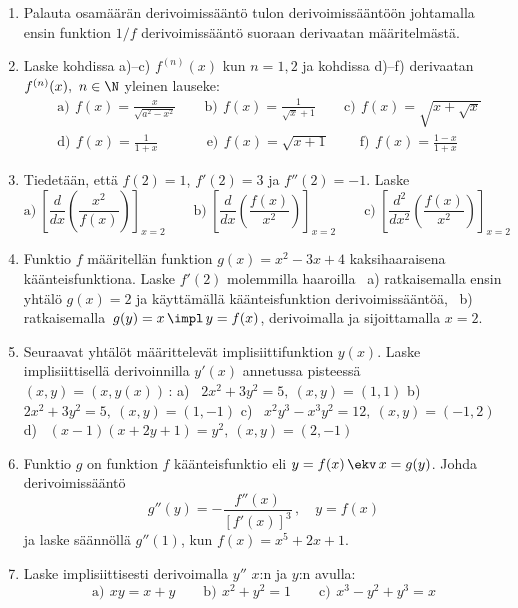 \begin{enumerate}
\item
Palauta osamäärän derivoimissääntö tulon derivoimissääntöön johtamalla ensin funktion
$1/f$ derivoimissääntö suoraan derivaatan määritelmästä.

\item
Laske kohdissa a)--c) $f^{(n)}(x)$ kun $n=1,2$ ja kohdissa d)--f) derivaatan
$f^{(n)}(x),\ n\in\N$ yleinen lauseke:
\begin{align*}
&\text{a)}\,\ f(x)=\frac{x}{\sqrt{a^2-x^2}} \qquad 
 \text{b)}\,\ f(x)=\frac{1}{\sqrt{x}+1} \qquad
 \text{c)}\,\ f(x)=\sqrt{x+\sqrt{x}} \\
&\text{d)}\,\ f(x)=\frac{1}{1+x} \qquad\quad\ \ 
 \text{e)}\,\ f(x)=\sqrt{x+1} \qquad\
 \text{f)}\,\ f(x)=\frac{1-x}{1+x}
\end{align*}

\item
Tiedetään, että $f(2)=1$, $f'(2)=3$ ja $f''(2)=-1$. Laske
\[
\text{a)}\ \left[\frac{d}{dx}\left(\frac{x^2}{f(x)}\right)\right]_{x=2} \qquad
\text{b)}\ \left[\frac{d}{dx}\left(\frac{f(x)}{x^2}\right)\right]_{x=2} \qquad
\text{c)}\ \left[\frac{d^2}{dx^2}\left(\frac{f(x)}{x^2}\right)\right]_{x=2}
\]

\item
Funktio $f$ määritellän funktion $g(x)=x^2-3x+4$ kaksihaaraisena käänteisfunktiona. Laske
$f'(2)$ molemmilla haaroilla \ a) ratkaisemalla ensin yhtälö $g(x)=2$ ja käyttämällä
käänteisfunktion derivoimissääntöä, \ b) ratkaisemalla $\,g(y)=x\,\impl\,y=f(x)$,
derivoimalla ja sijoittamalla $x=2$. 

\item
Seuraavat yhtälöt määrittelevät implisiittifunktion $y(x)$. Laske implisiittisellä
derivoinnilla $y'(x)$ annetussa pisteessä $(x,y)=(x,y(x))$\,: \newline
a) \ $2x^2+3y^2=5,\ (x,y)=(1,1)$ \newline
b) \ $2x^2+3y^2=5,\ (x,y)=(1,-1)$ \newline
c) \ $x^2y^3-x^3y^2=12,\ (x,y)=(-1,2)$ \newline
d) \ $(x-1)(x+2y+1)=y^2,\ (x,y)=(2,-1)$

\item
Funktio $g$ on funktion $f$ käänteisfunktio eli $y=f(x)\,\ekv\, x=g(y)$. Johda
derivoimissääntö
\[
g''(y)=-\frac{f''(x)}{[f'(x)]^3}\,, \quad y=f(x)
\]
ja laske säännöllä $g''(1)$, kun $f(x)=x^5+2x+1$.

\item
Laske implisiittisesti derivoimalla $y''$ $x$:n ja $y$:n avulla:
\[
\text{a)}\,\ xy=x+y \qquad \text{b)}\,\ x^2+y^2=1 \qquad \text{c)}\,\ x^3-y^2+y^3=x
\]


\end{enumerate}
